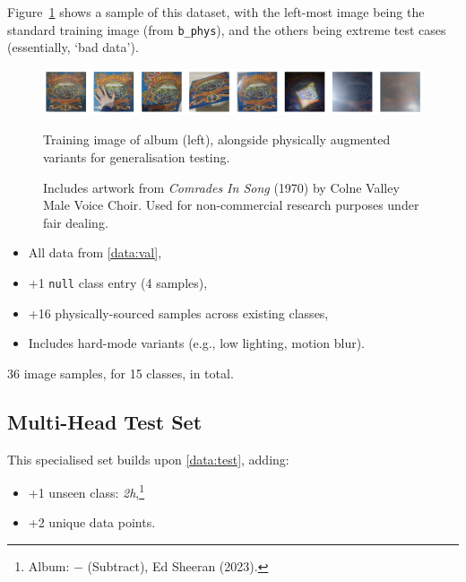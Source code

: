\begin{uomappendix}
                Figure~\ref{fig:dataTest} shows a sample of this dataset, with the left-most image being the standard training image (from \texttt{b\_phys}), and the others being extreme test cases (essentially, `bad data').
    
                \begin{figure}[H]
                    \centering
                    \includegraphics[width=\linewidth]{images/ChallengeData.png}
                    \caption{Training image of album (left), alongside physically augmented variants for generalisation testing.}
                    \label{fig:dataTest}
                    \caption*{Includes artwork from \textit{Comrades In Song} (1970) by Colne Valley Male Voice Choir. Used for non-commercial research purposes under fair dealing.}
                \end{figure}
    
                \begin{itemize}
                    \item All data from \ref{data:val},
                    \item +1 \texttt{null} class entry (4 samples),
                    \item +16 physically-sourced samples across existing classes,
                    \item Includes hard-mode variants (e.g., low lighting, motion blur).
                \end{itemize}
    
                36 image samples, for 15 classes, in total.
    
            \subsection{Multi-Head Test Set} \label{data:test2}
    
                This specialised set builds upon \ref{data:test}, adding:
                \begin{itemize}
                    \item +1 unseen class: \textit{2h},\footnote{Album: − (Subtract), Ed Sheeran (2023).}
                    \item +2 unique data points.
                \end{itemize}
    

\end{uomappendix}
